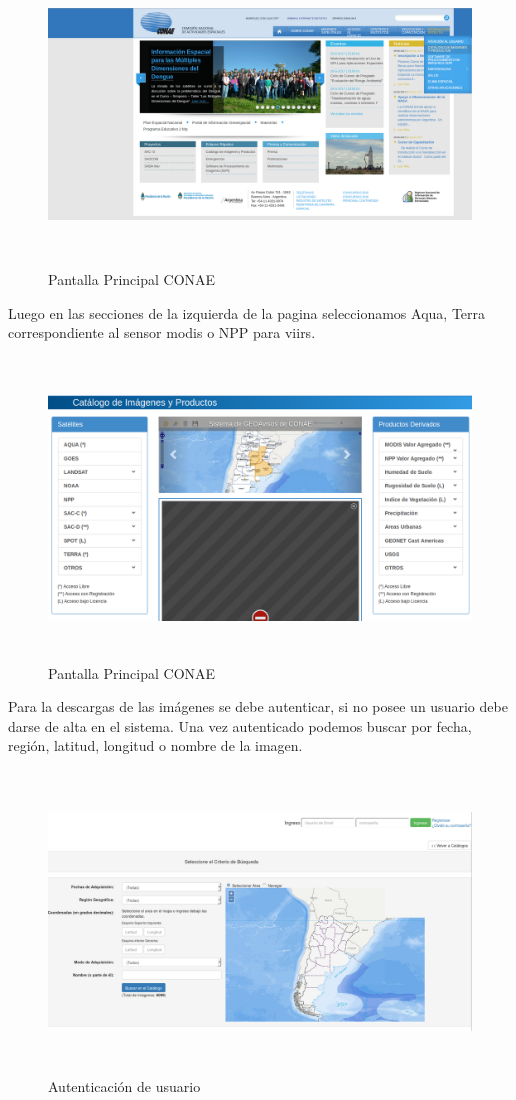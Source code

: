 \begin{figure}[H]
 \centering
  \includegraphics[height=8cm,keepaspectratio=true,clip=true]{imagenes/Apendice/conaepag.png}
  \caption{Pantalla Principal CONAE}
\end{figure}
Luego en las secciones de la izquierda de la pagina seleccionamos Aqua, Terra correspondiente al sensor modis o NPP para viirs.
\begin{figure}[h]
 \centering
  \includegraphics[height=8cm,keepaspectratio=true,clip=true]{imagenes/Apendice/conaepag1.png}
  \caption{Pantalla Principal CONAE}
\end{figure}
Para la descargas de las imágenes se debe autenticar, si no posee un usuario debe darse de alta en el sistema. Una vez autenticado podemos buscar por fecha, región, latitud,
longitud o nombre de la imagen.
\begin{figure}[h]
 \centering
  \includegraphics[height=8cm,keepaspectratio=true,clip=true]{imagenes/Apendice/conaepag2.png}
  \caption{Autenticación de usuario}
\end{figure}
